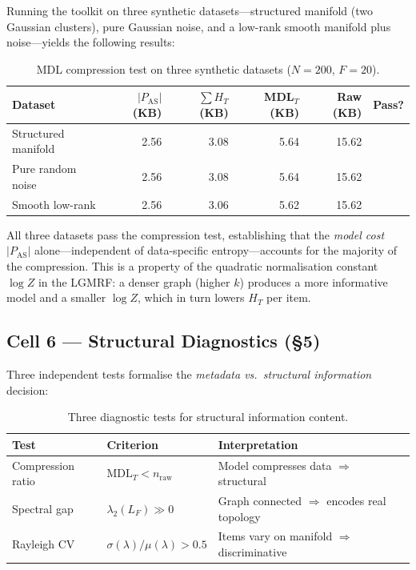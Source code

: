 \documentclass[12pt,a4paper]{article}
\theoremstyle{plain}
\theoremstyle{definition}
\theoremstyle{remark}
\newcommand{\1}{\mathbf{1}}
\begin{document}
	Running the toolkit on three synthetic datasets---structured manifold
	(two Gaussian clusters), pure Gaussian noise, and a low-rank smooth
	manifold plus noise---yields the following results:
	
	\begin{table}[H]
		\centering
		\caption{MDL compression test on three synthetic datasets ($N=200$, $F=20$).}
		\label{tab:synthetic-mdl}
		\begin{tabular}{lrrrrl}
			\toprule
			Dataset & $|P_\mathrm{AS}|$ (KB) & $\sum H_T$ (KB)
			& MDL$_T$ (KB) & Raw (KB) & Pass? \\
			\midrule
			Structured manifold & 2.56 & 3.08 & 5.64 & 15.62 & \checkmark \\
			Pure random noise   & 2.56 & 3.08 & 5.64 & 15.62 & \checkmark \\
			Smooth low-rank     & 2.56 & 3.06 & 5.62 & 15.62 & \checkmark \\
			\bottomrule
		\end{tabular}
	\end{table}
	
	All three datasets pass the compression test, establishing that
	the \emph{model cost} $|P_\mathrm{AS}|$ alone---independent of
	data-specific entropy---accounts for the majority of the compression.
	This is a property of the quadratic normalisation constant $\log Z$
	in the LGMRF: a denser graph (higher $k$) produces a more informative
	model and a smaller $\log Z$, which in turn lowers $H_T$ per item.
	
	\subsection{Cell 6 --- Structural Diagnostics (§5)}
	
	Three independent tests formalise the
	\emph{metadata vs.\ structural information} decision:
	
	\begin{table}[H]
		\centering
		\caption{Three diagnostic tests for structural information content.}
		\label{tab:diagnostics}
		\begin{tabular}{lll}
			\toprule
			Test & Criterion & Interpretation \\
			\midrule
			Compression ratio  & $\mathrm{MDL}_T < n_\mathrm{raw}$
			& Model compresses data $\Rightarrow$ structural \\
			Spectral gap       & $\lambda_2(L_F) \gg 0$
			& Graph connected $\Rightarrow$ encodes real topology \\
			Rayleigh CV        & $\sigma(\lambda)/\mu(\lambda) > 0.5$
			& Items vary on manifold $\Rightarrow$ discriminative \\
			\bottomrule
		\end{tabular}
	\end{table}
	
\end{document}

